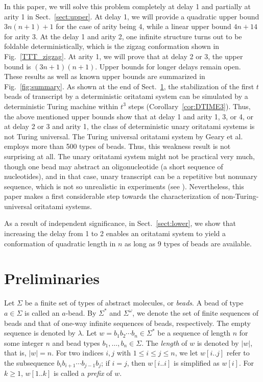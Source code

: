 \documentclass[runningheads]{llncs}
\begin{document}
In this paper, we will solve this problem  completely at delay 1 and partially at arity 1 in Sect.~\ref{sect:upper}. 
At delay 1, we will provide a quadratic upper bound $3n(n+1)+1$ for the case of arity being 4, while a linear upper bound $4n+14$ for arity 3. 
At the delay 1 and arity 2, one infinite structure turns out to be foldable deterministically, which is the zigzag conformation shown in Fig.~\ref{TTT_zigzag}. 
At arity 1, we will prove that at delay 2 or 3, the upper bound is $(3n+1)(n+1)$. 
Upper bounds for longer delays remain open. These results as well as known upper bounds are summarized in Fig.~\ref{fig:summary}. 
As shown at the end of Sect.~\ref{sec:preliminaries}, the stabilization of the first $t$ beads of transcript by a deterministic oritatami system can be simulated by a deterministic Turing machine within $t^3$ steps (Corollary~\ref{cor:DTIME3}). 
Thus, the above mentioned upper bounds show that at delay 1 and arity 1, 3, or 4, or at delay 2 or 3 and arity 1, the class of deterministic unary oritatami systems is not Turing universal. 
The Turing universal oritatami system by Geary et al. \cite{GeMeScSe2018} employs more than 500 types of beads. 
Thus, this weakness result is not surprising at all. 
The unary oritatami system might not be practical very much, though one bead may abstract an oligonucleotide (a short sequence of nucleotides), and in that case, unary transcript can be a repetitive but nonunary sequence, which is not so unrealistic in experiments (see \cite{GearyAndersen2014}). 
Nevertheless, this paper makes a first considerable step towards the characterization of non-Turing-universal oritatami systems. 

As a result of independent significance, in Sect.~\ref{sect:lower}, we show that increasing the delay from 1 to 2 enables an oritatami system to yield a conformation of quadratic length in $n$ as long as 9 types of beads are available. 

	\section{Preliminaries}\label{sec:preliminaries}

Let $\Sigma$ be a finite set of types of abstract molecules, or \textit{beads}. 
A bead of type $a \in \Sigma$ is called an $a$-bead. 
By $\Sigma^*$ and $\Sigma^\omega$, we denote the set of finite sequences of beads and that of one-way infinite sequences of beads, respectively. 
The empty sequence is denoted by $\lambda$. 
Let $w = b_1 b_2 \cdots b_n \in \Sigma^*$ be a sequence of length $n$ for some integer $n$ and bead types $b_1, \ldots, b_n \in \Sigma$. 
The \textit{length} of $w$ is denoted by $|w|$, that is, $|w| = n$. 
For two indices $i, j$ with $1 \le i \le j \le n$, we let $w[i..j]$ refer to the subsequence $b_i b_{i+1} \cdots b_{j-1}b_j$; if $i = j$, then $w[i..i]$ is simplified as $w[i]$. 
For $k \ge 1$, $w[1..k]$ is called a \textit{prefix} of $w$. 
\end{document}

